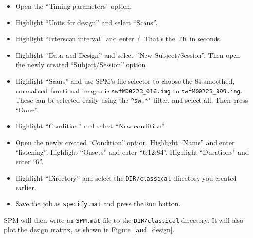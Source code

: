 \begin{itemize}
\item Open the ``Timing parameters'' option.
\item Highlight ``Units for design'' and select ``Scans''.
\item Highlight ``Interscan interval'' and enter 7. That's the TR in seconds.
\item Highlight ``Data and Design'' and select ``New Subject/Session''. Then open the newly created ``Subject/Session'' option.
\item Highlight ``Scans'' and use SPM's file selector to choose the 84 smoothed, normalised functional images ie \texttt{swfM00223\_016.img} to \texttt{swfM00223\_099.img}. These can be selected easily using the \texttt{\textasciicircum sw.*'} filter, and select all. Then press ``Done''.
\item Highlight ``Condition'' and select ``New condition''.
\item Open the newly created ``Condition'' option. Highlight ``Name'' and enter ``listening''. Highlight ``Onsets'' and enter ``6:12:84''. Highlight ``Durations'' and enter ``6''.
\item Highlight ``Directory'' and select the \texttt{DIR/classical} directory you created earlier.
\item Save the job as \texttt{specify.mat} and press the \texttt{Run} button.
\end{itemize}

SPM will then write an \texttt{SPM.mat} file to the \texttt{DIR/classical} directory. It will also plot the design matrix, as shown in Figure~\ref{aud_design}. 

